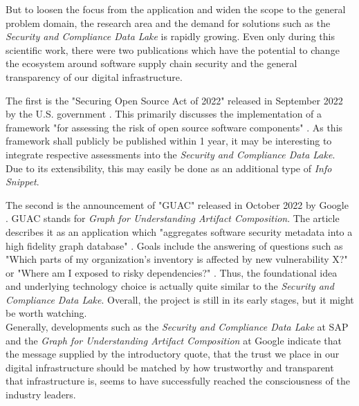 But to loosen the focus from the application and widen the scope to the general problem domain, the research area and the demand for solutions such as the \emph{Security and Compliance Data Lake} is rapidly growing. Even only during this scientific work, there were two publications which have the potential to change the ecosystem around software supply chain security and the general transparency of our digital infrastructure.\par
The first is the "Securing Open Source Act of 2022" released in September 2022 by the U.S. government \cite{SecuringOpenSourceAct}. This primarily discusses the implementation of a framework "for assessing the risk of open source software components" \cite{SecuringOpenSourceAct}. As this framework shall publicly be published within 1 year, it may be interesting to integrate respective assessments into the \emph{Security and Compliance Data Lake}. Due to its extensibility, this may easily be done as an additional type of \emph{Info Snippet}.\par
The second is the announcement of "GUAC" released in October 2022 by Google \cite{GUAC}. GUAC stands for \emph{Graph for Understanding Artifact Composition}. The article describes it as an application which "aggregates software security metadata into a high fidelity graph database" \cite{GUAC}. Goals include the answering of questions such as "Which parts of my organization's inventory is affected by new vulnerability X?" or "Where am I exposed to risky dependencies?" \cite{GUAC}. Thus, the foundational idea and underlying technology choice is actually quite similar to the \emph{Security and Compliance Data Lake}. Overall, the project is still in its early stages, but it might be worth watching.\\

Generally, developments such as the \emph{Security and Compliance Data Lake} at SAP and the \emph{Graph for Understanding Artifact Composition} at Google indicate that the message supplied by the introductory quote, that the trust we place in our digital infrastructure should be matched by how trustworthy and transparent that infrastructure is, seems to have successfully reached the consciousness of the industry leaders.



